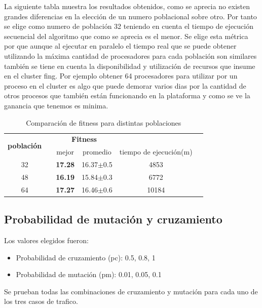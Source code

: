 La siguiente tabla muestra los resultados obtenidos, como se aprecia no existen grandes diferencias en la elección de un numero poblacional sobre otro. Por tanto se elige como numero de población 32 teniendo en cuenta el tiempo de ejecución secuencial del algoritmo que como se aprecia es el menor. Se elige esta métrica por que aunque al ejecutar en paralelo el tiempo real que se puede obtener utilizando la máxima cantidad de procesadores para cada población son similares también se tiene en cuenta la disponibilidad y utilización de recursos que insume en el cluster fing. Por ejemplo obtener 64 procesadores para utilizar por un proceso en el cluster es algo que puede demorar varios dias por la cantidad de otros procesos que también están funcionando en la plataforma y como se ve la ganancia que tenemos es minima.

\begin{table}
	\renewcommand{\arraystretch}{1.2}
	\caption{Comparación de fitness para distintas poblaciones}
	\label{table:parametro_poblacion}
	\centering
	\begin{tabular}{ccrrcr}
		\hline
		\multirow{2}{*}{\textbf{población}} & & 
		\multicolumn{2}{c}{\textbf{Fitness}} \\
		\cline{3-4}
		& & \multicolumn{1}{c}{mejor} 
		& \multicolumn{1}{c}{promedio} 
		& \multicolumn{1}{c}{tiempo de ejecución(m)} \\
		\hline
		32 & & \textbf{17.28} & 16.37$\pm$0.5 & 4853\\
		48 & & \textbf{16.19} & 15.84$\pm$0.3 & 6772\\
		64 & & \textbf{17.27} & 16.46$\pm$0.6 & 10184\\
		\hline
	\end{tabular}
\end{table}




\subsection{Probabilidad de mutación y cruzamiento}

Los valores elegidos fueron:

\begin{itemize}
	\item Probabilidad de cruzamiento (pc):  0.5, 0.8, 1
	\item Probabilidad de  mutación (pm):  0.01, 0.05, 0.1
\end{itemize}

Se prueban todas las combinaciones  de cruzamiento y mutación para cada uno de los tres casos de trafico.

